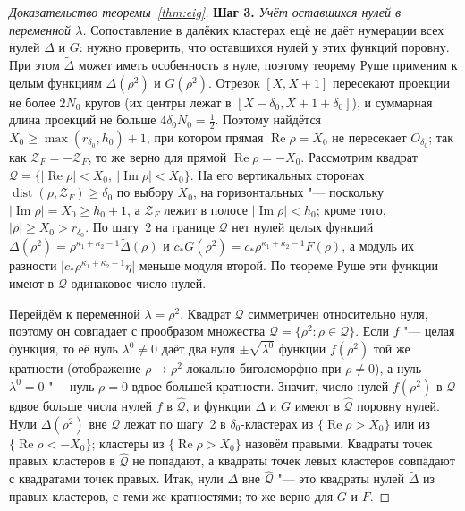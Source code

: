 \documentclass[12pt,a4paper]{article}
\numberwithin{equation}{section}
\theoremstyle{definition}
\newcommand{\step}[1]{\smallskip\noindent\textbf{Шаг #1.}}
\newcommand{\abs}[1]{\lvert#1\rvert}
\newcommand{\Imm}{\operatorname{Im}}
\newcommand{\Ree}{\operatorname{Re}}
\newcommand{\Zf}{\mathcal Z_F}
\begin{document}
\begin{proof}[Доказательство теоремы~\ref{thm:eig}]
\step{3} \textit{Учёт оставшихся нулей в переменной $\lambda$.}
Сопоставление в далёких кластерах ещё не даёт нумерации всех нулей $\Delta$ и $G$:
нужно проверить, что оставшихся нулей у этих функций поровну. При этом
$\widetilde\Delta$ может иметь особенность в нуле, поэтому теорему Руше
применим к целым функциям $\Delta(\rho^2)$ и $G(\rho^2)$.
Отрезок $[X,X+1]$ пересекают проекции не более $2N_0$ кругов (их центры лежат в
$[X-\delta_0,X+1+\delta_0]$), и суммарная длина проекций не больше $4\delta_0N_0=\frac12$. Поэтому
найдётся $X_0\ge\max(r_{\delta_0},h_0)+1$, при котором прямая $\Ree\rho=X_0$ не пересекает
$O_{\delta_0}$; так как $\Zf=-\Zf$, то же верно для прямой $\Ree\rho=-X_0$. Рассмотрим квадрат
$\mathcal Q=\{\abs{\Ree\rho}<X_0,\ \abs{\Imm\rho}<X_0\}$. На его вертикальных сторонах
$\operatorname{dist}(\rho,\Zf)\ge\delta_0$ по выбору $X_0$, на горизонтальных "--- поскольку
$\abs{\Imm\rho}=X_0\ge h_0+1$, а $\Zf$ лежит в полосе $\abs{\Imm\rho}<h_0$; кроме того,
$\abs\rho\ge X_0>r_{\delta_0}$. По шагу~2 на границе $\mathcal Q$ нет нулей целых функций
$\Delta(\rho^2)=\rho^{\kappa_1+\kappa_2-1}\widetilde\Delta(\rho)$ и
$c_\ast G(\rho^2)=c_\ast\rho^{\kappa_1+\kappa_2-1}F(\rho)$, а модуль их разности
$\abs{c_\ast\rho^{\kappa_1+\kappa_2-1}\eta}$ меньше модуля второй. По теореме Руше эти функции
имеют в $\mathcal Q$ одинаковое число нулей.

Перейдём к переменной $\lambda=\rho^2$. Квадрат $\mathcal Q$ симметричен относительно нуля, поэтому
он совпадает с прообразом множества $\widehat{\mathcal Q}=\{\rho^2:\rho\in\mathcal Q\}$. Если $f$
"--- целая функция, то её нуль $\lambda^0\ne0$ даёт два нуля $\pm\sqrt{\lambda^0}$ функции
$f(\rho^2)$ той же кратности (отображение $\rho\mapsto\rho^2$ локально биголоморфно при
$\rho\ne0$), а нуль $\lambda^0=0$ "--- нуль $\rho=0$ вдвое большей кратности. Значит, число нулей
$f(\rho^2)$ в $\mathcal Q$ вдвое больше числа нулей $f$ в $\widehat{\mathcal Q}$, и функции
$\Delta$ и $G$ имеют в $\widehat{\mathcal Q}$ поровну нулей. Нули $\Delta(\rho^2)$ вне
$\mathcal Q$ лежат по шагу~2 в $\delta_0$-кластерах из $\{\Ree\rho>X_0\}$ или из
$\{\Ree\rho<-X_0\}$; кластеры из $\{\Ree\rho>X_0\}$ назовём правыми. Квадраты точек правых
кластеров в $\widehat{\mathcal Q}$ не попадают, а квадраты точек левых кластеров совпадают с
квадратами точек правых. Итак, нули $\Delta$ вне $\widehat{\mathcal Q}$ "--- это квадраты нулей
$\widetilde\Delta$ из правых кластеров, с теми же кратностями; то же верно для $G$ и $F$.


\end{proof}
\end{document}
